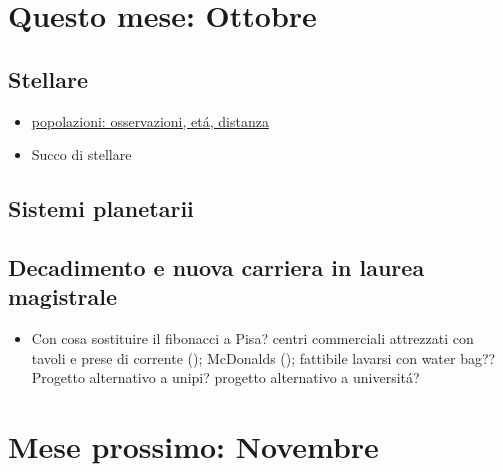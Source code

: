 \documentclass[main.tex]{subfiles}
\begin{document}
\chapter{Questo mese: Ottobre}

\section{Stellare}
\begin{itemize}
\item \href{http://campus.unibo.it/111203/1/pop1_2013.pptx.pdf}{popolazioni: osservazioni, et\'a, distanza}
\item Succo di stellare
\end{itemize}

\section{Sistemi planetarii}

\section{Decadimento e nuova carriera in laurea magistrale}
\begin{itemize}

\item Con cosa sostituire il fibonacci a Pisa? centri commerciali attrezzati con tavoli e prese di corrente ();  
McDonalds (); fattibile lavarsi con water bag??
Progetto alternativo a unipi? progetto alternativo a universit\'a?

\end{itemize}

\chapter{Mese prossimo: Novembre}


\end{document}
